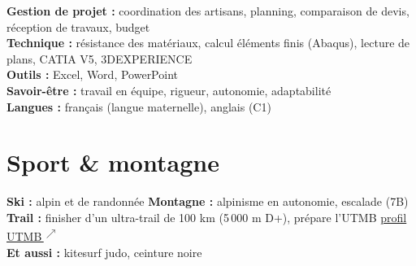 \documentclass[10pt,a4paper]{article}
\newcommand{\lk}{\,\textsuperscript{$\nearrow$}}
\newcommand{\link}[2]{\href{#1}{#2\lk}}
\newcommand{\sep}{\,{\scriptsize\textbullet}\,}
\begin{document}
\textbf{Gestion de projet :} coordination des artisans, planning, comparaison de devis, réception de travaux, budget\\
\textbf{Technique :} résistance des matériaux, calcul éléments finis (Abaqus), lecture de plans, CATIA V5, 3DEXPERIENCE\\
\textbf{Outils :} Excel, Word, PowerPoint\\
\textbf{Savoir-être :} travail en équipe, rigueur, autonomie, adaptabilité\\
\textbf{Langues :} français (langue maternelle), anglais (C1)

\section{Sport \& montagne}

\textbf{Ski :} alpin et de randonnée\sep \textbf{Montagne :} alpinisme en autonomie, escalade (7B)\\
\textbf{Trail :} finisher d'un ultra-trail de 100 km (5\,000 m D+), prépare l'UTMB \quad\link{https://utmb.world/fr/runner/4895528.gauthier.bonhomme}{profil UTMB}\\
\textbf{Et aussi :} kitesurf\sep judo, ceinture noire
\end{document}
